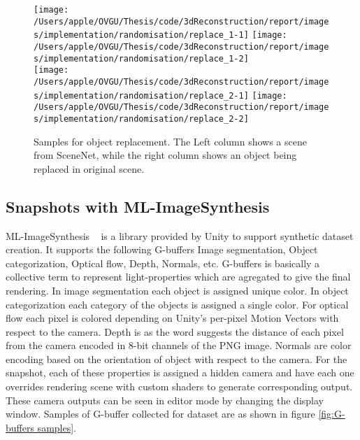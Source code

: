 \begin{figure}
    \centering
        \texttt{[image: /Users/apple/OVGU/Thesis/code/3dReconstruction/report/images/implementation/randomisation/replace\_1-1]}
        \texttt{[image: /Users/apple/OVGU/Thesis/code/3dReconstruction/report/images/implementation/randomisation/replace\_1-2]} \\
        \vspace{0.1cm}
        \texttt{[image: /Users/apple/OVGU/Thesis/code/3dReconstruction/report/images/implementation/randomisation/replace\_2-1]}
        \texttt{[image: /Users/apple/OVGU/Thesis/code/3dReconstruction/report/images/implementation/randomisation/replace\_2-2]}\\
    \caption{Samples for object replacement. The Left column shows a scene from SceneNet, while the right column shows an object being replaced in original scene.}
    \label{fig:replace model}
\end{figure}

\subsection{Snapshots with ML-ImageSynthesis}

ML-ImageSynthesis ~\cite{imagesynthesis} is a library provided by Unity to support synthetic dataset creation.
It supports the following G-buffers Image segmentation, Object categorization, Optical flow, Depth, Normals, etc.
G-buffers is basically a collective term to represent light-properties which are agregated to give the final rendering.
In image segmentation each object is assigned unique color.
In object categorization each category of the objects is assigned a single color.
For optical flow each pixel is colored depending on Unity's per-pixel Motion Vectors with respect to the camera.
Depth is as the word suggests the distance of each pixel from the camera encoded in 8-bit channels of the PNG image.
Normals are color encoding based on the orientation of object with respect to the camera.
For the snapshot, each of these properties is assigned a hidden camera and have each one overrides rendering scene with custom shaders to generate corresponding output.
These camera outputs can be seen in editor mode by changing the display window.
Samples of G-buffer collected for dataset are as shown in figure \ref{fig:G-buffers samples}.

